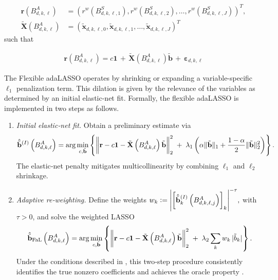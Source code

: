 \documentclass[10pt,a4paper,oneside]{article}
\DeclarePairedDelimiter{\norma}{\lVert}{\rVert} %
\DeclarePairedDelimiter{\aval}{\lvert}{\rvert} %
\begin{document}
\begin{align*}
    \mathbf{r}\left( B^A_{d, k, \ell} \right)         & = \left( r^w\left( B^S_{d, k, \ell, 1} \right), r^w\left( B^S_{d, k, \ell, 2}\right), \dots, r^w\left( B^S_{d, k, \ell, J} \right) \right)^T, \\
    \tilde{\mathbf{X}}\left( B^A_{d, k, \ell} \right) & = \left( \tilde{\mathbf{x}}_{d,k,\ell,0}, \tilde{\mathbf{x}}_{d,k,\ell,1}, \dots, \tilde{\mathbf{x}}_{d,k,\ell,J}  \right)^T
\end{align*}
such that

\begin{align*}
    \mathbf{r}\left( B^A_{d, k, \ell} \right) = c \mathbf{1} \, + \, \tilde{\mathbf{X}}\left( B^A_{d, k, \ell} \right) \tilde{\mathbf{b}} \, + \, \boldsymbol{\varepsilon}_{d, k, \ell}
\end{align*}


The Flexible adaLASSO operates by shrinking or expanding a variable-specific $\ell_1$ penalization term. This dilation is given by the relevance of the variables as determined by an initial elastic-net fit. Formally, the flexible adaLASSO is implemented in two steps as follows.

\begin{enumerate}[label=(\roman*)]
    \item \emph{Initial elastic‐net fit.}  Obtain a preliminary estimate via
          \[
              \hat{\tilde{\mathbf{b}}}^{(I)} \left( B^A_{d, k, \ell} \right)
              = \arg\min_{c, \tilde{\mathbf{b}}} \left\{
              \norma*{\mathbf{r} - c \mathbf{1} - \tilde{\mathbf{X}} \left( B^A_{d, k, \ell}\right)\tilde{\mathbf{b}}}_2^2
              \;+\;\lambda_1\left(\alpha\|\tilde{\mathbf{b}}\|_1 + \frac{1-\alpha}{2} \|\tilde{\mathbf{b}}\|_2^2\right) \right\}.
          \]
          The elastic‐net penalty mitigates multicollinearity by combining \(\ell_1\) and \(\ell_2\) shrinkage.

    \item \emph{Adaptive re‐weighting.}  Define the weights
          \(
          w_k := \aval*{\left[\hat{\tilde{\mathbf{b}}}_k^{(I)}\left( B^A_{d, k, \ell, j} \right) \right]_{k}}^{-\tau},
          \)
          with \(\tau>0\), and solve the weighted LASSO
          \[
              \hat{\tilde{\mathbf{b}}}_{\mathrm{FaL}} \left( B^A_{d, k, \ell} \right)
              = \arg\min_{c, \tilde{\mathbf{b}}} \left\{
              \norma*{\mathbf{r} - c \mathbf{1} -  \tilde{\mathbf{X}} \left( B^A_{d, k, \ell}\right)\tilde{\mathbf{b}}}_2^2
              \;+\;\lambda_2\sum_{k} w_k\,|\tilde b_k| \right\}.
          \]
          Under the conditions described in \cite{MEDEIROS2016255}, this two‐step procedure consistently identifies the true nonzero coefficients and achieves the oracle property \cite{MEDEIROS2016255}.
\end{enumerate}
\end{document}
